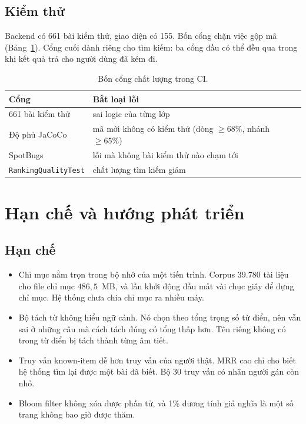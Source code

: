 \documentclass[9pt,twocolumn,a4paper]{extarticle}
\newcommand{\code}[1]{\texttt{#1}}
\begin{document}
\subsection{Kiểm thử}
Backend có 661 bài kiểm thử, giao diện có 155. Bốn cổng chặn việc gộp mã (Bảng~\ref{tab:gates}). Cổng cuối dành riêng cho tìm kiếm: ba cổng đầu có thể đều qua trong khi kết quả trả cho người dùng đã kém đi.

\begin{table}[H]
\centering
\caption{Bốn cổng chất lượng trong CI.}
\label{tab:gates}
\footnotesize
\begin{tabular}{@{}p{2.6cm}p{5.0cm}@{}}
\toprule
Cổng & Bắt loại lỗi \\
\midrule
661 bài kiểm thử & sai logic của từng lớp \\
Độ phủ JaCoCo & mã mới không có kiểm thử (dòng $\ge68\%$, nhánh $\ge65\%$) \\
SpotBugs & lỗi mà không bài kiểm thử nào chạm tới \\
\code{RankingQualityTest} & chất lượng tìm kiếm giảm \\
\bottomrule
\end{tabular}
\end{table}

\section{Hạn chế và hướng phát triển}
\label{chap:future}
\subsection{Hạn chế}
\begin{itemize}\itemsep0pt
\item Chỉ mục nằm trọn trong bộ nhớ của một tiến trình. Corpus 39.780 tài liệu cho file chỉ mục $486{,}5$~MB, và lần khởi động đầu mất vài chục giây để dựng chỉ mục. Hệ thống chưa chia chỉ mục ra nhiều máy.
\item Bộ tách từ không hiểu ngữ cảnh. Nó chọn theo tổng trọng số từ điển, nên vẫn sai ở những câu mà cách tách đúng có tổng thấp hơn. Tên riêng không có trong từ điển bị tách thành từng âm tiết.
\item Truy vấn known-item dễ hơn truy vấn của người thật. MRR cao chỉ cho biết hệ thống tìm lại được một bài đã biết. Bộ 30 truy vấn có nhãn người gán còn nhỏ.
\item Bloom filter không xóa được phần tử, và 1\% dương tính giả nghĩa là một số trang không bao giờ được thăm.
\end{itemize}
\end{document}
